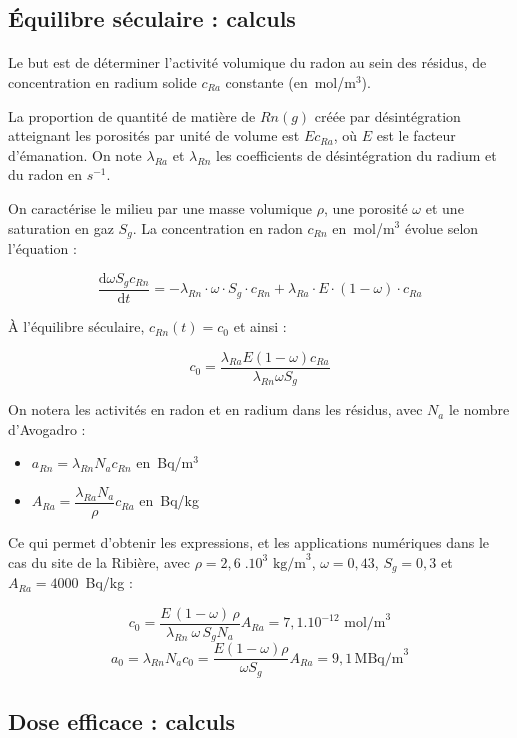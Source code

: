 \documentclass{article}
\begin{document}
\subsection{Équilibre séculaire : calculs }
\label{annexe:seculaire}

\paragraph{} Le but est de déterminer l'activité volumique du radon au sein des résidus, de concentration en radium solide $c_{Ra}$ constante (en~mol/m$^3$).

La proportion de quantité de matière de $Rn(g)$ créée par désintégration atteignant les porosités par unité de volume est $E c_{Ra}$, où $E$ est le facteur d’émanation. On note $\lambda_{Ra}$ et $\lambda_{Rn}$ les coefficients de désintégration du radium et du radon en $s^{-1}$. 

On caractérise le milieu par une masse volumique $\rho$, une porosité $\omega$ et une saturation en gaz $S_g$. La concentration en radon $c_{Rn}$ en~mol/m$^3$ évolue selon l'équation :

$$
\frac{\text{d} \omega S_g c_{Rn}}{\text{d}t} = - \lambda_{Rn}\cdot \omega\cdot S_g \cdot c_{Rn} + \lambda_{Ra} \cdot E \cdot(1-\omega)\cdot c_{Ra}
$$

À l'équilibre séculaire, $c_{Rn}(t)=c_0$ et ainsi :

$$
c_0 = \frac{ \lambda_{Ra} E (1-\omega) c_{Ra} }{\lambda_{Rn} \omega S_g}
$$

On notera les activités en radon et en radium dans les résidus, avec $N_a$ le nombre d'Avogadro :
\begin{itemize}
  \item $a_{Rn}= \lambda_{Rn} N_a c_{Rn}$ en~Bq/m$^3$
  \item $A_{Ra}= \dfrac{\lambda_{Ra} N_a }{\rho} c_{Ra}$ en~Bq/kg
\end{itemize}

Ce qui permet d'obtenir les expressions, et les applications numériques dans le cas du site de la Ribière, avec $\rho = 2,6 \;.10^3 \text{ kg/m}^3$, $\omega= 0,43$, $S_g=0,3$ et $A_{Ra}=4 000$~Bq/kg :

$$
c_0 = \dfrac{ E \,(1-\omega)\, \rho }{\lambda_{Rn}\: \omega \,S_g N_a} A_{Ra} = 7,1.10^{-12} \text{ mol/m}^3
$$
$$
a_0=\lambda_{Rn} N_a c_0 =\frac{E(1-\omega)\rho}{\omega S_g} A_{Ra} =9,1 \, \text{MBq/m}^3
$$

\subsection{Dose efficace : calculs}
\label{annexe:dose_efficace}
\end{document}
